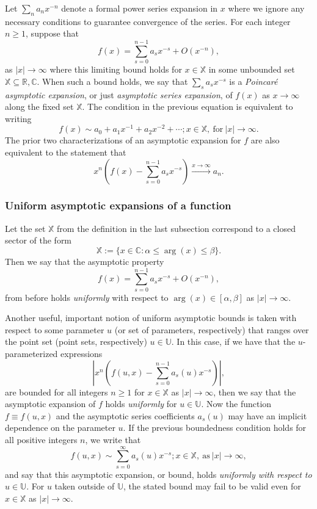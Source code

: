 \documentclass[11pt,reqno,a4letter]{article}
\numberwithin{figure}{section}
\numberwithin{table}{section}
\theoremstyle{plain}
\numberwithin{theorem}{section}
\theoremstyle{definition}
\begin{document}
Let $\sum_{n} a_n x^{-n}$ denote a formal power series expansion in $x$ where we 
ignore any necessary conditions to guarantee convergence of the series. For each integer $n \geq 1$, suppose that 
\[
f(x) = \sum_{s=0}^{n-1} a_s x^{-s} + O(x^{-n}), 
\]
as $|x| \rightarrow \infty$ where this limiting bound holds for $x \in \mathbb{X}$ in some unbounded set 
$\mathbb{X} \subseteq \mathbb{R}, \mathbb{C}$. 
When such a bound holds, we say that $\sum_s a_s x^{-s}$ is a \emph{Poincar\'{e} asymptotic expansion}, 
or just \emph{asymptotic series expansion}, of $f(x)$ as $x \rightarrow \infty$ along the fixed set $\mathbb{X}$. 
The condition in the previous equation is equivalent to writing 
\[
f(x) \sim a_0 + a_1 x^{-1} + a_2 x^{-2} + \cdots; x \in \mathbb{X}, \mathrm{\ for \ } |x| \rightarrow \infty. 
\]
The prior two characterizations of an asymptotic expansion for $f$ are also equivalent to the 
statement that 
\[
x^n \left(f(x) - \sum_{s=0}^{n-1} a_s x^{-s}\right) \xrightarrow{x \rightarrow \infty} a_n. 
\] 

\subsubsection{Uniform asymptotic expansions of a function} 

Let the set $\mathbb{X}$ from the definition in the last subsection correspond to a 
closed sector of the form 
$$\mathbb{X} := \{x \in \mathbb{C}: \alpha \leq \operatorname{arg}(x) \leq \beta\}.$$ 
Then we say that the asymptotic property 
\[
f(x) = \sum_{s=0}^{n-1} a_s x^{-s} + O(x^{-n}), 
\]
from before holds \emph{uniformly} with respect to $\operatorname{arg}(x) \in [\alpha, \beta]$ as 
$|x| \rightarrow \infty$. 

Another useful, important notion of uniform asymptotic bounds is taken with respect to some parameter $u$ 
(or set of parameters, respectively) that ranges over the point set (point sets, respectively) 
$u \in \mathbb{U}$. In this case, if we have that the $u$-parameterized expressions 
\[
\left\lvert x^n\left(f(u, x) - \sum_{s=0}^{n-1} a_s(u) x^{-s}\right) \right\rvert, 
\]
are bounded for all integers $n \geq 1$ for $x \in \mathbb{X}$ as $|x| \rightarrow \infty$, then we say that 
the asymptotic expansion of $f$ holds \emph{uniformly} for $u \in \mathbb{U}$. 
Now the function $f \equiv f(u, x)$ and the 
asymptotic series coefficients $a_s(u)$ may have an implicit dependence on the parameter $u$. 
If the previous boundedness condition holds for all positive integers $n$, we write that 
\[
f(u, x) \sim \sum_{s=0}^{\infty} a_s(u) x^{-s}; x \in \mathbb{X}, \mathrm{\ as \ } |x| \rightarrow \infty, 
\]
and say that this asymptotic expansion, or bound, holds \emph{uniformly with respect to $u \in \mathbb{U}$}. 
For $u$ taken outside of $\mathbb{U}$, the stated bound may fail to be valid even for $x \in \mathbb{X}$ as 
$|x| \rightarrow \infty$. 
\end{document}
